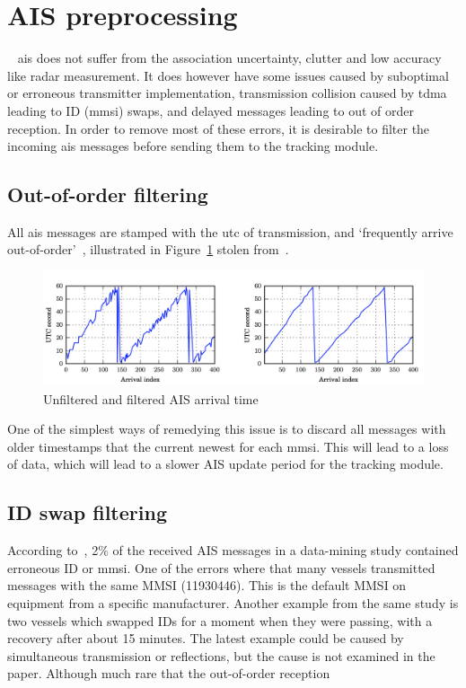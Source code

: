 \section{AIS preprocessing}~\label{sec:ais_preprocessing}
\Gls{ais} does not suffer from the association uncertainty, clutter and low accuracy like radar measurement. It does however have some issues caused by suboptimal or erroneous transmitter implementation, transmission collision caused by \gls{tdma} leading to ID (\gls{mmsi}) swaps, and delayed messages leading to out of order reception. In order to remove most of these errors, it is desirable to filter the incoming \gls{ais} messages before sending them to the tracking module.

\subsection{Out-of-order filtering}
All \gls{ais} messages are stamped with the \gls{utc} of transmission, and `frequently arrive out-of-order'~\cite{Wilthil}, illustrated in Figure~\ref{fig:out_of_order_ais} stolen from~\cite{Wilthil}.
\begin{figure}[H]
\centering
\includegraphics[width = .9\textwidth]{Figures/out_of_order_ais.png}
\caption{Unfiltered and filtered AIS arrival time}\label{fig:out_of_order_ais}
\end{figure}
One of the simplest ways of remedying this issue is to discard all messages with older timestamps that the current newest for each \gls{mmsi}. This will lead to a loss of data, which will lead to a slower AIS update period for the tracking module.

\subsection{ID swap filtering}
According to~\cite{Harati-Mokhtari2007}, 2\% of the received AIS messages in a data-mining study contained erroneous ID or \gls{mmsi}. One of the errors where that many vessels transmitted messages with the same MMSI (11930446). This is the default MMSI on equipment from a specific manufacturer. Another example from the same study is two vessels which swapped IDs for a moment when they were passing, with a recovery after about 15 minutes. The latest example could be caused by simultaneous transmission or reflections, but the cause is not examined in the paper. Although much rare that the out-of-order reception  

